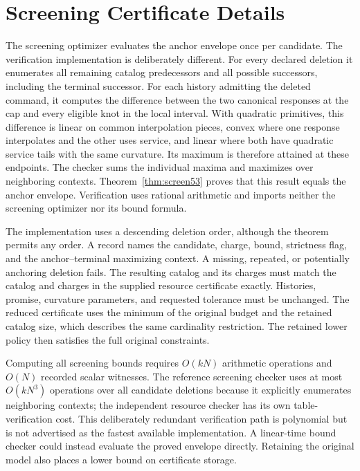 \section{Screening Certificate Details}\label{sec:screenec53}
The screening optimizer evaluates the anchor envelope once per candidate. The verification implementation is deliberately different. For every declared deletion it enumerates all remaining catalog predecessors and all possible successors, including the terminal successor. For each history admitting the deleted command, it computes the difference between the two canonical responses at the cap and every eligible knot in the local interval. With quadratic primitives, this difference is linear on common interpolation pieces, convex where one response interpolates and the other uses service, and linear where both have quadratic service tails with the same curvature. Its maximum is therefore attained at these endpoints. The checker sums the individual maxima and maximizes over neighboring contexts. Theorem~\ref{thm:screen53} proves that this result equals the anchor envelope. Verification uses rational arithmetic and imports neither the screening optimizer nor its bound formula.

The implementation uses a descending deletion order, although the theorem permits any order. A record names the candidate, charge, bound, strictness flag, and the anchor--terminal maximizing context. A missing, repeated, or potentially anchoring deletion fails. The resulting catalog and its charges must match the catalog and charges in the supplied resource certificate exactly. Histories, promise, curvature parameters, and requested tolerance must be unchanged. The reduced certificate uses the minimum of the original budget and the retained catalog size, which describes the same cardinality restriction. The retained lower policy then satisfies the full original constraints.

Computing all screening bounds requires $O(kN)$ arithmetic operations and $O(N)$ recorded scalar witnesses. The reference screening checker uses at most $O(kN^3)$ operations over all candidate deletions because it explicitly enumerates neighboring contexts; the independent resource checker has its own table-verification cost. This deliberately redundant verification path is polynomial but is not advertised as the fastest available implementation. A linear-time bound checker could instead evaluate the proved envelope directly. Retaining the original model also places a lower bound on certificate storage.


